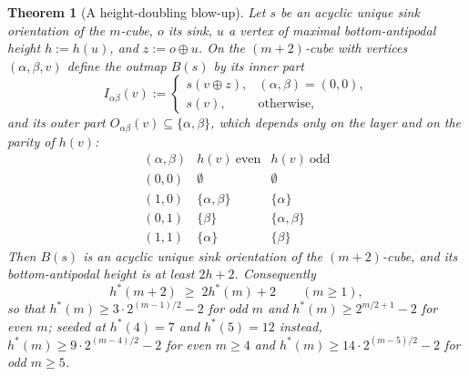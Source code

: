 \documentclass[11pt]{article}
\theoremstyle{plain}
\newtheorem{theorem}{Theorem}[section]
\theoremstyle{definition}
\begin{document}
\begin{theorem}[A height-doubling blow-up]\label{thm:blowup}
Let $s$ be an acyclic unique sink orientation of the $m$-cube, $o$ its
sink, $u$ a vertex of maximal bottom-antipodal height $h:=h(u)$, and
$z:=o\oplus u$. On the $(m+2)$-cube with vertices $(\alpha,\beta,v)$ define
the outmap $B(s)$ by its inner part
\[
  I_{\alpha\beta}(v):=\begin{cases} s(v\oplus z),&(\alpha,\beta)=(0,0),\\
  s(v),&\text{otherwise,}\end{cases}
\]
and its outer part $O_{\alpha\beta}(v)\subseteq\{\alpha,\beta\}$, which
depends only on the layer and on the parity of $h(v)$:
\[
 \begin{array}{c|cc}
   (\alpha,\beta) & h(v)\ \text{even} & h(v)\ \text{odd}\\ \hline
   (0,0) & \emptyset & \emptyset\\
   (1,0) & \{\alpha,\beta\} & \{\alpha\}\\
   (0,1) & \{\beta\} & \{\alpha,\beta\}\\
   (1,1) & \{\alpha\} & \{\beta\}
 \end{array}
\]
Then $B(s)$ is an acyclic unique sink orientation of the $(m+2)$-cube, and
its bottom-antipodal height is at least $2h+2$. Consequently
\[
  h^{\ast}(m+2)\;\ge\;2h^{\ast}(m)+2\qquad(m\ge1),
\]
so that $h^{\ast}(m)\ge3\cdot2^{(m-1)/2}-2$ for odd $m$ and
$h^{\ast}(m)\ge2^{m/2+1}-2$ for even $m$; seeded at $h^{\ast}(4)=7$ and
$h^{\ast}(5)=12$ instead, $h^{\ast}(m)\ge9\cdot2^{(m-4)/2}-2$ for even
$m\ge4$ and $h^{\ast}(m)\ge14\cdot2^{(m-5)/2}-2$ for odd $m\ge5$.
\end{theorem}
\end{document}
